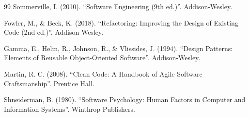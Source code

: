 \documentclass[a4paper,12pt]{article}
\theoremstyle{definition}
\begin{document}
\begin{thebibliography}{99}
 Sommerville, I. (2010). ``Software Engineering (9th ed.)''. Addison-Wesley.

 Fowler, M., \& Beck, K. (2018). ``Refactoring: Improving the Design of Existing Code (2nd ed.)''. Addison-Wesley.

 Gamma, E., Helm, R., Johnson, R., \& Vlissides, J. (1994). ``Design Patterns: Elements of Reusable Object-Oriented Software''. Addison-Wesley.

 Martin, R. C. (2008). ``Clean Code: A Handbook of Agile Software Craftsmanship''. Prentice Hall.

 Shneiderman, B. (1980). ``Software Psychology: Human Factors in Computer and Information Systems''. Winthrop Publishers.

\end{thebibliography}
\end{document}
